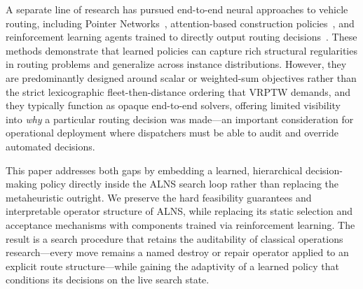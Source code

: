 \documentclass[journal]{IEEEtran}
\begin{document}
A separate line of research has pursued end-to-end neural approaches to vehicle routing, including Pointer Networks~\cite{vinyals2015pointer}, attention-based construction policies~\cite{kool2019attention}, and reinforcement learning agents trained to directly output routing decisions~\cite{nazari2018reinforcement}. These methods demonstrate that learned policies can capture rich structural regularities in routing problems and generalize across instance distributions. However, they are predominantly designed around scalar or weighted-sum objectives rather than the strict lexicographic fleet-then-distance ordering that VRPTW demands, and they typically function as opaque end-to-end solvers, offering limited visibility into \emph{why} a particular routing decision was made---an important consideration for operational deployment where dispatchers must be able to audit and override automated decisions.

This paper addresses both gaps by embedding a learned, hierarchical decision-making policy directly inside the ALNS search loop rather than replacing the metaheuristic outright. We preserve the hard feasibility guarantees and interpretable operator structure of ALNS, while replacing its static selection and acceptance mechanisms with components trained via reinforcement learning. The result is a search procedure that retains the auditability of classical operations research---every move remains a named destroy or repair operator applied to an explicit route structure---while gaining the adaptivity of a learned policy that conditions its decisions on the live search state.
\end{document}
